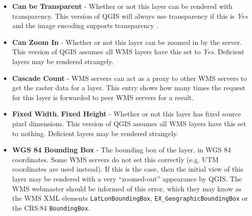 \begin{itemize}[label=--]
\begin{itemize}[label=--]
\item \textbf{Can be Transparent} - Whether or not this layer can be rendered with transparency.
                                    This version of 
                                    QGIS will always use transparency if this is \textsl{Yes}
                                    and the image encoding supports transparency
                                    .

\item \textbf{Can Zoom In}      - Whether or not this layer can be zoomed in by the server.  This version
                                  of QGIS assumes all WMS layers have this set to \textsl{Yes}.
                                  Deficient layers may be rendered strangely.

\item \textbf{Cascade Count}    - WMS servers can act as a proxy to other WMS servers to get
                                  the raster data for a layer.  This entry shows how
                                  many times the request for this layer is forwarded to peer
                                  WMS servers for a result.

\item \textbf{Fixed Width}, \textbf{Fixed Height}
                                - Whether or not this layer has fixed source pixel dimensions.
                                  This version
                                  of QGIS assumes all WMS layers have this set to nothing.
                                  Deficient layers may be rendered strangely.

\item \textbf{WGS 84 Bounding Box} - The bounding box of the layer, in WGS 84 coordinates.
                                     Some WMS servers do not set this correctly (e.g. UTM
                                     coordinates are used instead).  If this is the case,
                                     then the initial view of this layer may be rendered
                                     with a very ``zoomed-out'' appearance by QGIS.
                                     The WMS webmaster should be informed of this error,
                                     which they may know as the WMS XML elements
                                     \texttt{LatLonBoundingBox},
                                     \texttt{EX\_GeographicBoundingBox} or
                                     the CRS:84 \texttt{BoundingBox}.


\end{itemize}
\end{itemize}
